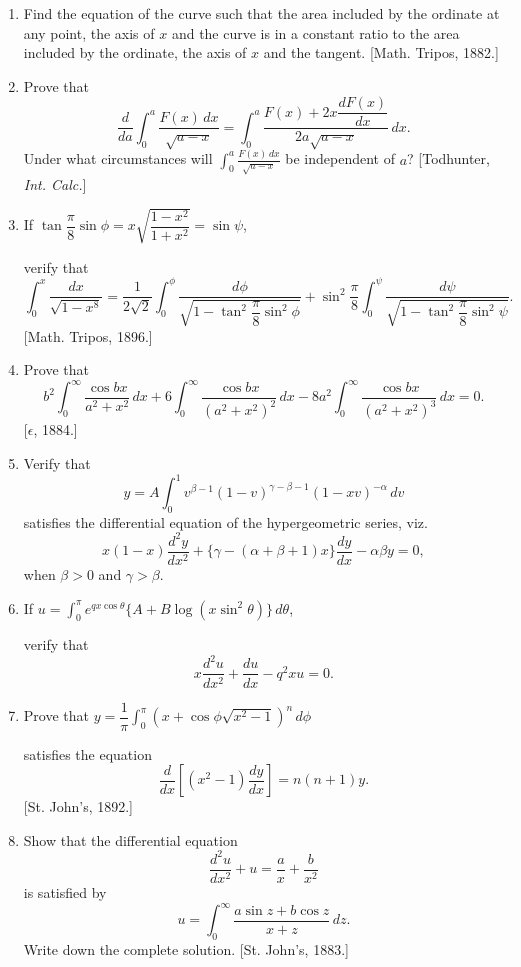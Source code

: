 \documentclass[11pt, a4paper]{article}
\newcommand{\source}[1]{\hfill\textnormal{[#1]}}
\begin{document}
\begin{enumerate}[leftmargin=2em]
\item Find the equation of the curve such that the area included by the ordinate at any point, the axis of $x$ and the curve is in a constant ratio to the area included by the ordinate, the axis of $x$ and the tangent. \source{Math. Tripos, 1882.}

\item Prove that
\[
\frac{d}{da}\int_0^a\frac{F(x)\,dx}{\sqrt{a-x}}=\int_0^a\frac{F(x)+2x\dfrac{dF(x)}{dx}}{2a\sqrt{a-x}}\,dx.
\]
Under what circumstances will $\displaystyle\int_0^a\frac{F(x)\,dx}{\sqrt{a-x}}$ be independent of $a$? \source{Todhunter, \textit{Int. Calc.}}

\item If $\tan\dfrac{\pi}{8}\sin\phi=x\sqrt{\dfrac{1-x^2}{1+x^2}}=\sin\psi$,

verify that
\[
\int_0^x\frac{dx}{\sqrt{1-x^8}}=\frac{1}{2\sqrt2}\int_0^\phi\frac{d\phi}{\sqrt{1-\tan^2\dfrac{\pi}{8}\sin^2\phi}}+\sin^2\frac{\pi}{8}\int_0^\psi\frac{d\psi}{\sqrt{1-\tan^2\dfrac{\pi}{8}\sin^2\psi}}.
\]
\source{Math. Tripos, 1896.}

\item Prove that
\[
b^2\int_0^\infty\frac{\cos bx}{a^2+x^2}\,dx+6\int_0^\infty\frac{\cos bx}{(a^2+x^2)^2}\,dx-8a^2\int_0^\infty\frac{\cos bx}{(a^2+x^2)^3}\,dx=0.
\]
\source{$\epsilon$, 1884.}

\item Verify that
\[
y=A\int_0^1v^{\beta-1}(1-v)^{\gamma-\beta-1}(1-xv)^{-\alpha}\,dv
\]
satisfies the differential equation of the hypergeometric series, viz.
\[
x(1-x)\frac{d^2y}{dx^2}+\{\gamma-(\alpha+\beta+1)x\}\frac{dy}{dx}-\alpha\beta y=0,
\]
when $\beta>0$ and $\gamma>\beta$.

\item If $u=\displaystyle\int_0^\pi e^{qx\cos\theta}\{A+B\log(x\sin^2\theta)\}\,d\theta$,

verify that
\[
x\frac{d^2u}{dx^2}+\frac{du}{dx}-q^2xu=0.
\]

\item Prove that $y=\dfrac1\pi\displaystyle\int_0^\pi(x+\cos\phi\sqrt{x^2-1})^n\,d\phi$

satisfies the equation
\[
\frac{d}{dx}\left[(x^2-1)\frac{dy}{dx}\right]=n(n+1)y.
\]
\source{St. John's, 1892.}

\item Show that the differential equation
\[
\frac{d^2u}{dx^2}+u=\frac{a}{x}+\frac{b}{x^2}
\]
is satisfied by
\[
u=\int_0^\infty\frac{a\sin z+b\cos z}{x+z}\,dz.
\]
Write down the complete solution. \source{St. John's, 1883.}


\end{enumerate}
\end{document}
